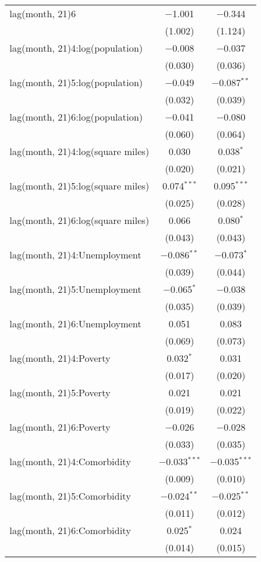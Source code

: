 \begin{tabular}{@{\extracolsep{1pt}}lcc}
  lag(month, 21)6 & $-$1.001 & $-$0.344 \\ 
  & (1.002) & (1.124) \\ 
  lag(month, 21)4:log(population) & $-$0.008 & $-$0.037 \\ 
  & (0.030) & (0.036) \\ 
  lag(month, 21)5:log(population) & $-$0.049 & $-$0.087$^{**}$ \\ 
  & (0.032) & (0.039) \\ 
  lag(month, 21)6:log(population) & $-$0.041 & $-$0.080 \\ 
  & (0.060) & (0.064) \\ 
  lag(month, 21)4:log(square miles) & 0.030 & 0.038$^{*}$ \\ 
  & (0.020) & (0.021) \\ 
  lag(month, 21)5:log(square miles) & 0.074$^{***}$ & 0.095$^{***}$ \\ 
  & (0.025) & (0.028) \\ 
  lag(month, 21)6:log(square miles) & 0.066 & 0.080$^{*}$ \\ 
  & (0.043) & (0.043) \\ 
  lag(month, 21)4:Unemployment & $-$0.086$^{**}$ & $-$0.073$^{*}$ \\ 
  & (0.039) & (0.044) \\ 
  lag(month, 21)5:Unemployment & $-$0.065$^{*}$ & $-$0.038 \\ 
  & (0.035) & (0.039) \\ 
  lag(month, 21)6:Unemployment & 0.051 & 0.083 \\ 
  & (0.069) & (0.073) \\ 
  lag(month, 21)4:Poverty & 0.032$^{*}$ & 0.031 \\ 
  & (0.017) & (0.020) \\ 
  lag(month, 21)5:Poverty & 0.021 & 0.021 \\ 
  & (0.019) & (0.022) \\ 
  lag(month, 21)6:Poverty & $-$0.026 & $-$0.028 \\ 
  & (0.033) & (0.035) \\ 
  lag(month, 21)4:Comorbidity & $-$0.033$^{***}$ & $-$0.035$^{***}$ \\ 
  & (0.009) & (0.010) \\ 
  lag(month, 21)5:Comorbidity & $-$0.024$^{**}$ & $-$0.025$^{**}$ \\ 
  & (0.011) & (0.012) \\ 
  lag(month, 21)6:Comorbidity & 0.025$^{*}$ & 0.024 \\ 
  & (0.014) & (0.015) \\ 

\end{tabular}
